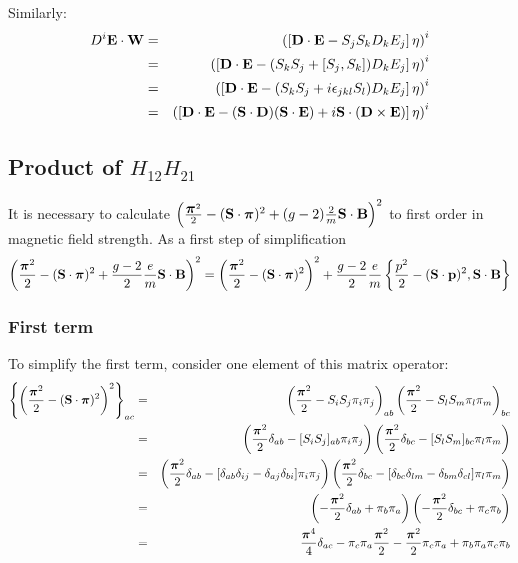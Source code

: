 Similarly:
\begin{eqnarray*}
 D^i \mathbf{E} \cdot \mathbf{W}
	&=& \left( \left[\mathbf{D} \cdot \mathbf{E}  - S_j S_k D_k E_j\right] \mathbf{\eta} \right)^i		\\
	&=& \left( \left[\mathbf{D} \cdot \mathbf{E}  -  (S_k S_j + [S_j, S_k]) D_k E_j \right] \mathbf{\eta} \right)^i		\\
	&=& \left( \left[\mathbf{D} \cdot \mathbf{E}  -  (S_k S_j +i\epsilon_{jkl} S_l) D_k E_j \right] \mathbf{\eta} \right)^i		\\
	&=& \left( \left[\mathbf{D} \cdot \mathbf{E}  - (\mathbf{S} \cdot \mathbf{D})(\mathbf{S} \cdot \mathbf{E}) + i \mathbf{S} \cdot (\mathbf{D} \times \mathbf{E})\right] \mathbf{\eta} \right)^i		\\
\end{eqnarray*}	

\subsection*{Product of $H_{12}H_{21}$}
It is necessary to calculate $\left(  \frac {\mbox{\boldmath$ \pi $}^2} {2} -  (\mathbf{S} \cdot \mbox{\boldmath$ \pi $})^2 + (g-2)\frac{2}{m} \mathbf{S} \cdot \mathbf{B} \right )^2 $ to first order in magnetic field strength.  As a first step of simplification
\[
\left(  \frac {\mbox{\boldmath$ \pi $}^2} {2} -  (\mathbf{S} \cdot \mbox{\boldmath$ \pi $})^2 + \frac{g-2}{2}\frac{e}{m} \mathbf{S} \cdot \mathbf{B} \right )^2 
	=	\left(  \frac {\mbox{\boldmath$ \pi $}^2} {2} -  (\mathbf{S} \cdot \mbox{\boldmath$ \pi $})^2  \right )^2 
		 +\frac{g-2}{2}\frac{e}{m} \left \{ \frac{p^2}{2} - (\mathbf{S} \cdot \mathbf{p})^2, \mathbf{S} \cdot \mathbf{B} \right \}
\]	

\subsubsection*{First term}
To simplify the first term, consider one element of this matrix operator:
\small
\begin{eqnarray*}
\left\{ \left(  \frac {\mbox{\boldmath$ \pi $}^2} {2} -  (\mathbf{S} \cdot \mbox{\boldmath$ \pi $})^2   \right )^2  \right \} _{ac}
	&=& 	\left (  \frac {\mbox{\boldmath$ \pi $}^2} {2} - S_i S_j \pi_i \pi_j \right)_{ab} 
				\left (  \frac {\mbox{\boldmath$ \pi $}^2} {2} - S_l S_m \pi_l \pi_m \right)_{bc}\\
	&=& 	\left (  \frac {\mbox{\boldmath$ \pi $}^2} {2}\delta_{ab} - [S_i S_j]_{ab} \pi_i \pi_j \right)
				\left (  \frac {\mbox{\boldmath$ \pi $}^2} {2}\delta_{bc} - [S_l S_m]_{bc} \pi_l \pi_m \right)\\
	&=& 	\left (  \frac {\mbox{\boldmath$ \pi $}^2} {2}\delta_{ab} - [\delta_{ab}\delta_{ij} - \delta_{aj}\delta_{bi}] \pi_i \pi_j \right)
				\left (  \frac {\mbox{\boldmath$ \pi $}^2} {2}\delta_{bc} -  [\delta_{bc}\delta_{lm} - \delta_{bm}\delta_{cl}] \pi_l \pi_m \right)\\
	&=& 	\left (  -\frac {\mbox{\boldmath$ \pi $}^2} {2}\delta_{ab} + \pi_b \pi_a \right)
				\left (  -\frac {\mbox{\boldmath$ \pi $}^2} {2}\delta_{bc} + \pi_c \pi_b \right) \\
	&=&  	\frac{ \mbox{\boldmath$ \pi $}^4 } {4} \delta_{ac}
				- \pi_c \pi_a \frac{\mbox{\boldmath$ \pi $}^2}{2}
				- \frac{\mbox{\boldmath$ \pi $}^2}{2} \pi_c \pi_a
				+ \pi_b \pi_a \pi_c \pi_b \\
\end{eqnarray*}
\normalsize

